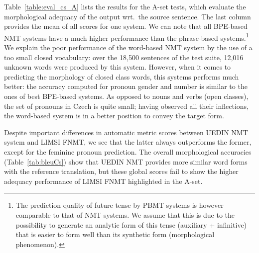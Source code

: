 \documentclass[11pt,letterpaper,final,nohyperref]{article}
\begin{document}
Table~\ref{table:eval_cs_A} lists the results for the A-set tests,
which evaluate the morphological adequacy of the output wrt.\ the source
sentence. The last column provides the mean of all scores for one system.
We can note that all BPE-based NMT systems have a much
higher performance than the phrase-based systems.\footnote{The prediction quality of
future tense by PBMT systems is however comparable to that of NMT systems.
We assume that this is due to the possibility to generate
an analytic form of this tense (auxiliary + infinitive) that is easier
to form well than its synthetic form (morphological phenomenon).}
We explain the poor performance of the word-based NMT system by the use of a too small
closed vocabulary: over the 18,500 sentences of the test suite, 12,016 unknown
words were produced by this system.
However, when it comes to predicting the morphology of closed
class words, this systems performs much better: the accuracy computed for pronoun
gender and number is similar to the ones of best BPE-based systems. As opposed
to nouns and verbs (open classes), the set of pronouns in Czech is quite small;
having observed all their inflections, the word-based system is in a better position
to convey the target form.

Despite important differences in automatic metric scores between UEDIN NMT system
and LIMSI FNMT, we see that the latter always outperforms the former, except for the
feminine pronoun prediction. The overall morphological accuracies (Table~\ref{tab:bleuCs})
show that UEDIN NMT provides more similar word forms with the reference translation,
but these global scores fail to show the higher adequacy performance of LIMSI FNMT 
highlighted in the A-set. 
\end{document}
